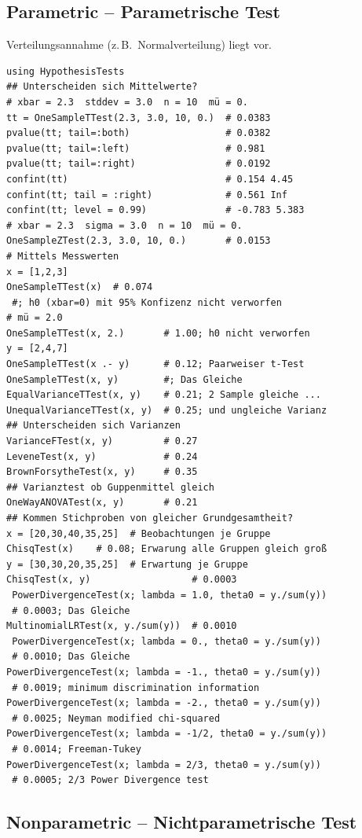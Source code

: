 \documentclass[10pt,twocolumn]{scrartcl}
\begin{document}
\subsection{Parametric -- Parametrische Test}

Verteilungsannahme (z.\,B.\ Normalverteilung) liegt vor.

\begin{lstlisting}
using HypothesisTests
## Unterscheiden sich Mittelwerte?
# xbar = 2.3  stddev = 3.0  n = 10  mü = 0.
tt = OneSampleTTest(2.3, 3.0, 10, 0.)  # 0.0383
pvalue(tt; tail=:both)                 # 0.0382
pvalue(tt; tail=:left)                 # 0.981
pvalue(tt; tail=:right)                # 0.0192
confint(tt)                            # 0.154 4.45
confint(tt; tail = :right)             # 0.561 Inf
confint(tt; level = 0.99)              # -0.783 5.383
# xbar = 2.3  sigma = 3.0  n = 10  mü = 0.
OneSampleZTest(2.3, 3.0, 10, 0.)       # 0.0153
# Mittels Messwerten
x = [1,2,3]
OneSampleTTest(x)  # 0.074
 #; h0 (xbar=0) mit 95% Konfizenz nicht verworfen
# mü = 2.0
OneSampleTTest(x, 2.)       # 1.00; h0 nicht verworfen
y = [2,4,7]
OneSampleTTest(x .- y)      # 0.12; Paarweiser t-Test
OneSampleTTest(x, y)        #; Das Gleiche
EqualVarianceTTest(x, y)    # 0.21; 2 Sample gleiche ...
UnequalVarianceTTest(x, y)  # 0.25; und ungleiche Varianz
## Unterscheiden sich Varianzen
VarianceFTest(x, y)         # 0.27
LeveneTest(x, y)            # 0.24
BrownForsytheTest(x, y)     # 0.35
## Varianztest ob Guppenmittel gleich
OneWayANOVATest(x, y)       # 0.21
## Kommen Stichproben von gleicher Grundgesamtheit?
x = [20,30,40,35,25]  # Beobachtungen je Gruppe
ChisqTest(x)    # 0.08; Erwarung alle Gruppen gleich groß
y = [30,30,20,35,25]  # Erwartung je Gruppe
ChisqTest(x, y)                  # 0.0003
 PowerDivergenceTest(x; lambda = 1.0, theta0 = y./sum(y))
 # 0.0003; Das Gleiche
MultinomialLRTest(x, y./sum(y))  # 0.0010
 PowerDivergenceTest(x; lambda = 0., theta0 = y./sum(y))
 # 0.0010; Das Gleiche
PowerDivergenceTest(x; lambda = -1., theta0 = y./sum(y))
 # 0.0019; minimum discrimination information
PowerDivergenceTest(x; lambda = -2., theta0 = y./sum(y))
 # 0.0025; Neyman modified chi-squared
PowerDivergenceTest(x; lambda = -1/2, theta0 = y./sum(y))
 # 0.0014; Freeman-Tukey
PowerDivergenceTest(x; lambda = 2/3, theta0 = y./sum(y))
 # 0.0005; 2/3 Power Divergence test
\end{lstlisting}

\subsection{Nonparametric -- Nichtparametrische Test}
\end{document}
